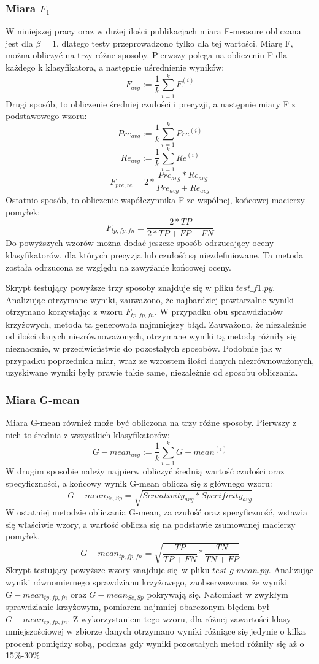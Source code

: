 \subsubsection{Miara $F_1$}
W niniejszej pracy oraz w dużej ilości publikacjach miara F-measure obliczana jest dla $\beta=1$, dlatego testy przeprowadzono tylko dla tej wartości. Miarę F, można obliczyć na trzy różne sposoby. Pierwszy polega na obliczeniu F dla każdego k klasyfikatora, a następnie uśrednienie wyników:
\[F_{avg} := \frac{1}{k} \sum_{i=1}^{k} F_1^{(i)}\]
Drugi sposób, to obliczenie średniej czułości i precyzji, a następnie miary F z podstawowego wzoru:
\[Pre_{avg} := \frac{1}{k} \sum_{i=1}^{k} Pre^{(i)}\]
\[Re_{avg} := \frac{1}{k} \sum_{i=1}^{k} Re^{(i)}\]
\[F_{pre, re} = 2 * \frac{Pre_{avg}*Re_{avg}}{Pre_{avg}+Re_{avg}} \]
Ostatnio sposób, to obliczenie współczynnika F ze wspólnej, końcowej macierzy pomyłek:
\[F_{tp, fp, fn} = \frac{2*TP}{2*TP+FP+FN} \]
Do powyższych wzorów można dodać jeszcze sposób odrzucający oceny klasyfikatorów, dla których precyzja lub czułość są niezdefiniowane. Ta metoda została odrzucona ze względu na zawyżanie końcowej oceny. \par 
Skrypt testujący powyższe trzy sposoby znajduje się w pliku $test\_f1.py$. Analizując otrzymane wyniki, zauważono, że najbardziej powtarzalne wyniki otrzymano korzystając z wzoru $F_{tp, fp, fn}$. W przypadku obu sprawdzianów krzyżowych, metoda ta generowała najmniejszy błąd. Zauważono, że niezależnie od ilości danych niezrównoważonych, otrzymane wyniki tą metodą różniły się nieznacznie, w przeciwieństwie do pozostałych sposobów. Podobnie jak w przypadku poprzednich miar, wraz ze wzrostem ilości danych niezrównoważonych, uzyskiwane wyniki były prawie takie same, niezależnie od sposobu obliczania.
\subsubsection{Miara G-mean}
Miara G-mean również może być obliczona na trzy różne sposoby. Pierwszy z nich to średnia z wszystkich klasyfikatorów:
\[G-mean_{avg} := \frac{1}{k} \sum_{i=1}^{k} G-mean^{(i)} \]
W drugim sposobie należy najpierw obliczyć średnią wartość czułości oraz specyficzności, a końcowy wynik G-mean oblicza się z głównego wzoru:
\[G-mean_{Se, Sp} = \sqrt{Sensitivity_{avg}*Specificity_{avg}} \]
W ostatniej metodzie obliczania G-mean, za czułość oraz specyficzność, wstawia się właściwie wzory, a wartość oblicza się na podstawie zsumowanej macierzy pomyłek.
\[G-mean_{tp, fp, fn} = \sqrt{\frac{TP}{TP + FN}*\frac{TN}{TN + FP}} \]
Skrypt testujący powyższe wzory znajduje się w pliku $test\_g\_mean.py$. Analizując wyniki równomiernego sprawdzianu krzyżowego, zaobserwowano, że  wyniki $G-mean_{tp, fp, fn}$ oraz $G-mean_{Se, Sp}$ pokrywają się. Natomiast w zwykłym sprawdzianie krzyżowym, pomiarem najmniej obarczonym błędem był $G-mean_{tp, fp, fn}$. Z wykorzystaniem tego wzoru, dla różnej zawartości klasy mniejszościowej w zbiorze danych otrzymano wyniki różniące się jedynie o kilka procent pomiędzy sobą, podczas gdy wyniki pozostałych metod różniły się aż o 15\%-30\%

